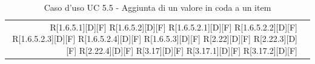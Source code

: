 \documentclass[a4paper]{article}
\begin{document}
\begin{table}[H]
\begin{tabularx}{\textwidth}{r X}
R[1.6.5.1][D][F] \newline
R[1.6.5.2][D][F] \newline
R[1.6.5.2.1][D][F] \newline
R[1.6.5.2.2][D][F] \newline
R[1.6.5.2.3][D][F] \newline
R[1.6.5.2.4][D][F] \newline
R[1.6.5.3][D][F] \newline
R[2.22][D][F] \newline
R[2.22.3][D][F] \newline
R[2.22.4][D][F] \newline
R[3.17][D][F] \newline
R[3.17.1][D][F] \newline
R[3.17.2][D][F]  \\
			\end{tabularx}
			\caption{Caso d'uso UC 5.5 - Aggiunta di un valore in coda a un item}
		 \end{table} 
		 
\end{document}
